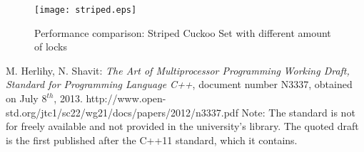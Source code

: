\documentclass[a4paper,10pt]{article}
\begin{document}
\begin{figure}[H]
\begin{center}
\texttt{[image: striped.eps]}
\end{center}
\caption{Performance comparison: Striped Cuckoo Set with different amount of locks}
\label{fig:plot3}
\end{figure}


\begin{thebibliography}{9}
    M. Herlihy, N. Shavit:
   \emph{The Art of Multiprocessor Programming}
	\emph{Working Draft, Standard for Programming Language C++},
	document number N3337, obtained on July $8^{th}$, 2013.	
	http://www.open-std.org/jtc1/sc22/wg21/docs/papers/2012/n3337.pdf
	\newline
	Note: The standard is not for freely available and not provided in the university's  library. The quoted draft is the first published after the C++11 standard, which it contains.

\end{thebibliography}
\end{document}
